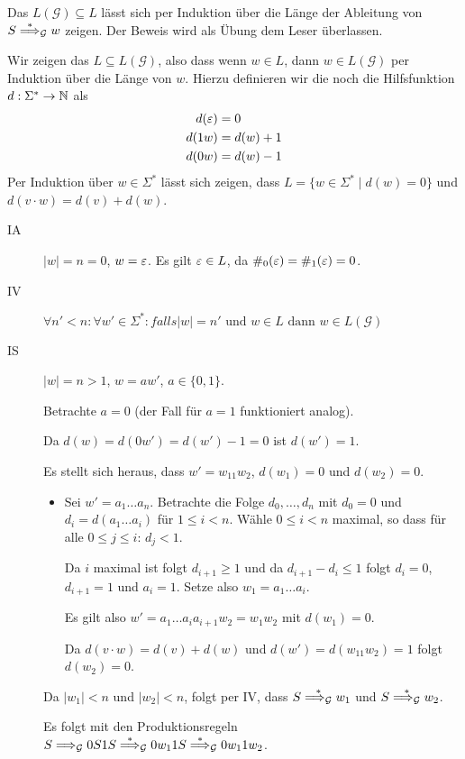 \begin{itemize}
  Das $L(\mathcal{G}) \subseteq L$ lässt sich per Induktion über die Länge der Ableitung von $S \stackrel{*}{\==>}_\mathcal{G} w$ zeigen.
  Der Beweis wird als Übung dem Leser überlassen.

  Wir zeigen das $L \subseteq L(\mathcal{G})$, also dass wenn $w \in L$, dann $w \in L(\mathcal{G})$ per Induktion über die Länge von $w$.
  Hierzu definieren wir die noch die Hilfsfunktion $d : \Sigma^* \to \mathbb{N}$ als
  \begin{align*}
    d(\varepsilon) &= 0 \\
    d(1w) &= d(w) + 1 \\
    d(0w) &= d(w) - 1
  \end{align*}
  Per Induktion über $w \in \Sigma^*$ lässt sich zeigen, dass $L = \{w \in \Sigma^* \mid d(w) = 0\}$ und $d(v \cdot w) = d(v) + d(w)$.
\begin{description}
\item[IA] $|w| = n = 0$, $w = \varepsilon$. Es gilt $\varepsilon \in L$, da $\#_0(\varepsilon) = \#_1(\varepsilon) = 0$.
\item[IV] $\forall n' < n: \forall w' \in \Sigma^*: falls |w| = n' \text{ und } w \in L \text{ dann } w \in L(\mathcal{G})$
\item[IS] $|w| = n > 1$, $w = aw'$, $a \in \{0,1\}$.

  Betrachte $a = 0$ (der Fall für $a = 1$ funktioniert analog).

  Da $d(w) = d(0w') = d(w') - 1 = 0$ ist $d(w') = 1$.

  Es stellt sich heraus, dass $w' = w_11w_2$, $d(w_1) = 0$ und $d(w_2) = 0$.
  \begin{itemize}
  \item[] 
    Sei $w' = a_1 \ldots a_n$.
    Betrachte die Folge $d_0,\ldots,d_n$ mit $d_0 = 0$ und $d_i = d(a_1\ldots a_i)$ für $1 \le i < n$.
    Wähle $0 \le i < n$ maximal, so dass für alle $0 \le j \le i$: $d_j < 1$.

    Da $i$ maximal ist folgt $d_{i+1} \ge 1$ und da $d_{i+1} - d_i \le 1$  folgt $d_i = 0$, $d_{i+1} = 1$ und $a_i = 1$.
    Setze also $w_1 = a_1\ldots a_{i}$.

    Es gilt also $w' = a_1\ldots a_{i}a_{i+1}w_2 = w_1w_2$ mit $d(w_1) = 0$.

    Da $d(v \cdot w) = d(v) + d(w)$ und $d(w') = d(w_11w_2) = 1$ folgt $d(w_2) = 0$.
  \end{itemize}

  Da $|w_1| < n$ und $|w_2| < n$, folgt per IV, dass $S \stackrel{*}{ \==>_{\mathcal{G}} } w_1$ und $S \stackrel{*}{\==>_{\mathcal{G}}} w_2$.

  Es folgt mit den Produktionsregeln $S \==>_{\mathcal{G}} 0S1S \stackrel{*}{\==>}_{\mathcal{G}} 0w_11S \stackrel{*}{\==>}_{\mathcal{G}} 0w_11w_2$.

\end{description}
\end{itemize}

